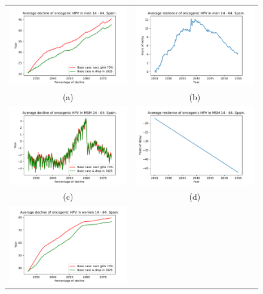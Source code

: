 \begin{figure}[!]
	\centering
	\begin{tabular}{cc}
		\includegraphics[width=0.5\linewidth]{IMGs/11.-Resilencia/Base_y_3/decline_onco_hom.pdf}	& 
		\includegraphics[width=0.5\linewidth]{IMGs/11.-Resilencia/Base_y_3/resilencia_onco_hom.pdf}  \\ 
		(a)	& (b) \\ 
		\includegraphics[width=0.5\linewidth]{IMGs/11.-Resilencia/Base_y_3/decline_onco_MSM.pdf}	& 
		\includegraphics[width=0.5\linewidth]{IMGs/11.-Resilencia/Base_y_3/resilencia_onco_MSM.pdf}  \\ 
		(c)	& (d) \\
		\includegraphics[width=0.5\linewidth]{IMGs/11.-Resilencia/Base_y_3/decline_onco_muj.pdf}	& 

\end{tabular}
\end{figure}
